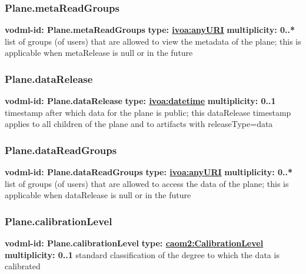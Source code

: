     \subsubsection{Plane.metaReadGroups}
      \textbf{vodml-id: Plane.metaReadGroups} \newline
      \textbf{type: \hyperref[sect:ivoa]{ivoa:anyURI}} \newline
      \textbf{multiplicity: 0..*} \newline
      list of groups (of users) that are allowed to view the metadata of the plane; this is applicable when metaRelease is null or in the future

    \subsubsection{Plane.dataRelease}
      \textbf{vodml-id: Plane.dataRelease} \newline
      \textbf{type: \hyperref[sect:ivoa]{ivoa:datetime}} \newline
      \textbf{multiplicity: 0..1} \newline
      timestamp after which data for the plane is public; this dataRelease timestamp applies to all children of the plane and to artifacts with releaseType=data

    \subsubsection{Plane.dataReadGroups}
      \textbf{vodml-id: Plane.dataReadGroups} \newline
      \textbf{type: \hyperref[sect:ivoa]{ivoa:anyURI}} \newline
      \textbf{multiplicity: 0..*} \newline
      list of groups (of users) that are allowed to access the data of the plane; this is applicable when dataRelease is null or in the future

    \subsubsection{Plane.calibrationLevel}
      \textbf{vodml-id: Plane.calibrationLevel} \newline
      \textbf{type: \hyperref[sect:CalibrationLevel]{caom2:CalibrationLevel}} \newline
      \textbf{multiplicity: 0..1} \newline
      standard classification of the degree to which the data is calibrated

